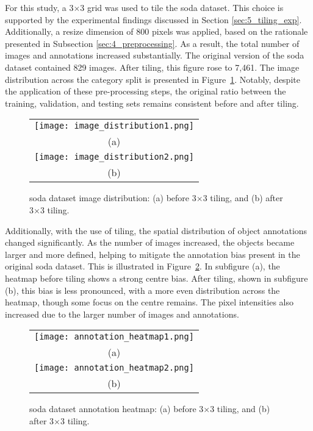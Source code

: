 For this study, a 3$\times$3 grid was used to tile the \gls{soda} dataset. This choice is supported by the experimental findings discussed in Section \ref{sec:5_tiling_exp}. Additionally, a resize dimension of 800 pixels was applied, based on the rationale presented in Subsection \ref{sec:4_preprocessing}. As a result, the total number of images and annotations increased substantially. The original version of the \gls{soda} dataset contained 829 images. After tiling, this figure rose to 7,461. The image distribution across the category split is presented in Figure~\ref{fig:soda_image_distribution}. Notably, despite the application of these pre-processing steps, the original ratio between the training, validation, and testing sets remains consistent before and after tiling.
\begin{figure}[!ht]
  \centering
  \begin{tabular}{c}
    \texttt{[image: image\_distribution1.png]} \\
    \small (a) \\
    \addlinespace[1em]
    \texttt{[image: image\_distribution2.png]} \\
    \small (b) \\
  \end{tabular}
  \caption{\gls{soda} dataset image distribution: (a) before 3$\times$3 tiling, and (b) after 3$\times$3 tiling.}
  \label{fig:soda_image_distribution}
\end{figure}

Additionally, with the use of tiling, the spatial distribution of object annotations changed significantly. As the number of images increased, the objects became larger and more defined, helping to mitigate the annotation bias present in the original \gls{soda} dataset. This is illustrated in Figure~\ref{fig:soda_annotation_heatmap}. In subfigure (a), the heatmap before tiling shows a strong centre bias. After tiling, shown in subfigure (b), this bias is less pronounced, with a more even distribution across the heatmap, though some focus on the centre remains. The pixel intensities also increased due to the larger number of images and annotations.

\begin{figure}[!ht]
  \centering
  \begin{tabular}{c}
    \texttt{[image: annotation\_heatmap1.png]} \\
    \small (a) \\
    \addlinespace[1em]
    \texttt{[image: annotation\_heatmap2.png]} \\
    \small (b) \\
  \end{tabular}
  \caption{\gls{soda} dataset annotation heatmap: (a) before 3$\times$3 tiling, and (b) after 3$\times$3 tiling.}
  \label{fig:soda_annotation_heatmap}
\end{figure}

